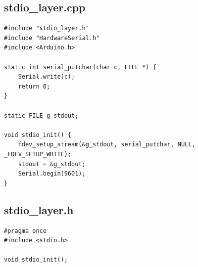 \documentclass[12pt,a4paper]{article}
\begin{document}
\subsection{stdio\_layer.cpp}
\begin{lstlisting}
#include "stdio_layer.h"
#include "HardwareSerial.h"
#include <Arduino.h>

static int serial_putchar(char c, FILE *) {
    Serial.write(c);
    return 0;
}

static FILE g_stdout;

void stdio_init() {
    fdev_setup_stream(&g_stdout, serial_putchar, NULL, _FDEV_SETUP_WRITE);
    stdout = &g_stdout;
    Serial.begin(9601);
}
\end{lstlisting}

\subsection{stdio\_layer.h}
\begin{lstlisting}
#pragma once
#include <stdio.h>

void stdio_init();
\end{lstlisting}
\end{document}
